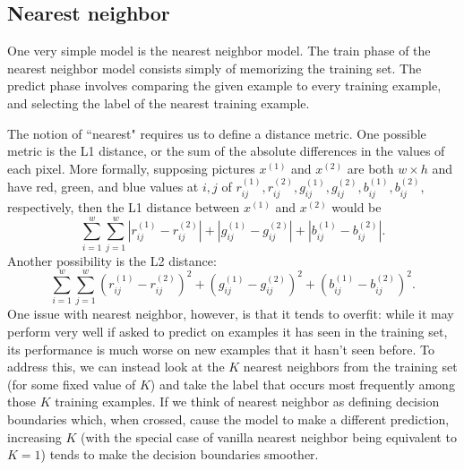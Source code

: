 \subsection{Nearest neighbor}
One very simple model is the nearest neighbor model. The train phase of the nearest neighbor model consists simply of memorizing the training set. The predict phase involves comparing the given example to every training example, and selecting the label of the nearest training example.

The notion of ``nearest" requires us to define a distance metric. One possible metric is the L1 distance, or the sum of the absolute differences in the values of each pixel. More formally, supposing pictures $x^{(1)}$ and $x^{(2)}$ are both $w \times h$ and have red, green, and blue values at $i, j$ of $r^{(1)}_{ij}, r^{(2)}_{ij}, g^{(1)}_{ij}, g^{(2)}_{ij}, b^{(1)}_{ij}, b^{(2)}_{ij}$, respectively, then the L1 distance between $x^{(1)}$ and $x^{(2)}$ would be
$$\sum_{i = 1}^w \sum_{j=1}^w \left| r^{(1)}_{ij} - r^{(2)}_{ij} \right| + \left| g^{(1)}_{ij} - g^{(2)}_{ij} \right| + \left| b^{(1)}_{ij} - b^{(2)}_{ij} \right|.$$
Another possibility is the L2 distance:
$$\sum_{i = 1}^w \sum_{j=1}^w \left( r^{(1)}_{ij} - r^{(2)}_{ij} \right)^2 + \left( g^{(1)}_{ij} - g^{(2)}_{ij} \right)^2 + \left( b^{(1)}_{ij} - b^{(2)}_{ij} \right)^2.$$
One issue with nearest neighbor, however, is that it tends to overfit: while it may perform very well if asked to predict on examples it has seen in the training set, its performance is much worse on new examples that it hasn't seen before. To address this, we can instead look at the $K$ nearest neighbors from the training set (for some fixed value of $K$) and take the label that occurs most frequently among those $K$ training examples. If we think of nearest neighbor as defining decision boundaries which, when crossed, cause the model to make a different prediction, increasing $K$ (with the special case of vanilla nearest neighbor being equivalent to $K = 1$) tends to make the decision boundaries smoother.

